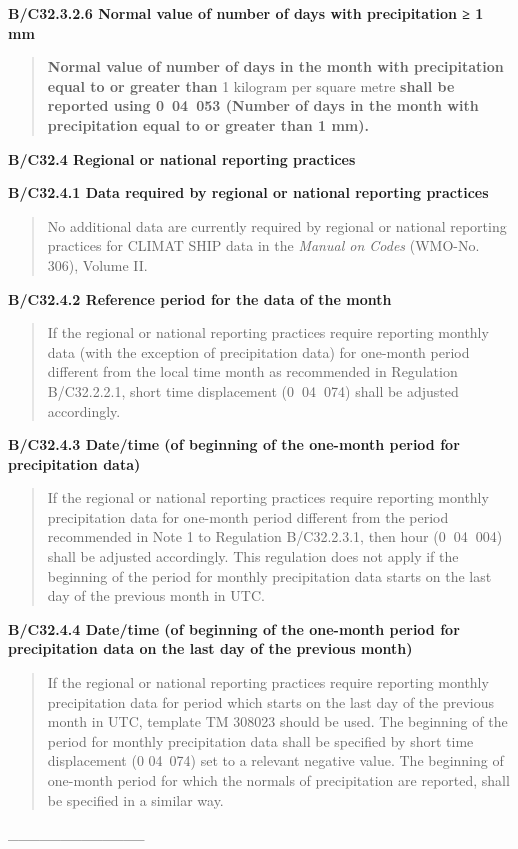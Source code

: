\textbf{B/C32.3.2.6 Normal value of number of days with precipitation ≥ 1 mm}

\begin{quote}
\textbf{Normal value of number of days in the month with precipitation equal to or greater than} 1 kilogram per square metre \textbf{shall be reported using 0~04~053 (Number of days in the month with precipitation equal to or greater than 1 mm).}
\end{quote}

\textbf{B/C32.4 Regional or national reporting practices}

\textbf{B/C32.4.1 Data required by regional or national reporting practices}

\begin{quote}
No additional data are currently required by regional or national reporting practices for CLIMAT SHIP data in the \emph{Manual on Codes} (WMO-No. 306), Volume II.
\end{quote}

\textbf{B/C32.4.2 Reference period for the data of the month}

\begin{quote}
If the regional or national reporting practices require reporting monthly data (with the exception of precipitation data) for one-month period different from the local time month as recommended in Regulation B/C32.2.2.1, short time displacement (0\textbf{~}04\textbf{~}074) shall be adjusted accordingly.
\end{quote}

\textbf{B/C32.4.3 Date/time (of beginning of the one-month period for precipitation data)}

\begin{quote}
If the regional or national reporting practices require reporting monthly precipitation data for one-month period different from the period recommended in Note 1 to Regulation B/C32.2.3.1, then hour (0\textbf{~}04\textbf{~}004) shall be adjusted accordingly. This regulation does not apply if the beginning of the period for monthly precipitation data starts on the last day of the previous month in UTC.
\end{quote}

\textbf{B/C32.4.4 Date/time (of beginning of the one-month period for precipitation data on the last day of the previous month)}

\begin{quote}
If the regional or national reporting practices require reporting monthly precipitation data for period which starts on the last day of the previous month in UTC, template TM 308023 should be used. The beginning of the period for monthly precipitation data shall be specified by short time displacement (0 04~074) set to a relevant negative value. The beginning of one-month period for which the normals of precipitation are reported, shall be specified in a similar way.
\end{quote}

\_\_\_\_\_\_\_\_\_\_\_\_\_

